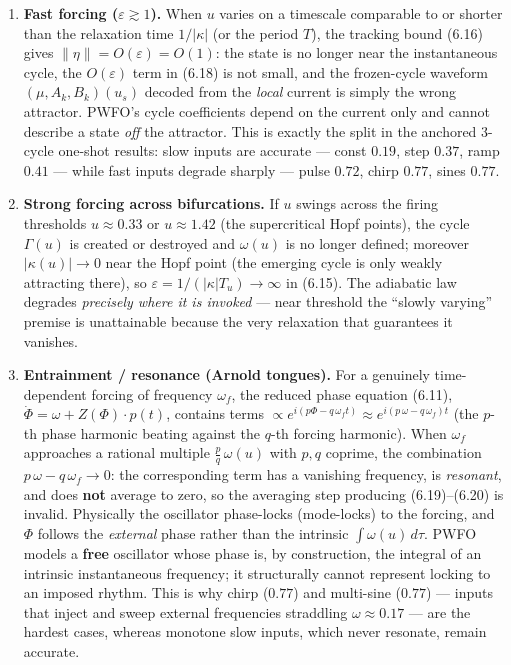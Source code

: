 \documentclass[
  11pt,
]{article}
\begin{document}
\begin{enumerate}
\def\labelenumi{\arabic{enumi}.}
\item
  \textbf{Fast forcing (\(\varepsilon\gtrsim1\)).} When \(u\) varies on
  a timescale comparable to or shorter than the relaxation time
  \(1/|\kappa|\) (or the period \(T\)), the tracking bound (6.16) gives
  \(\|\eta\|=O(\varepsilon)=O(1)\): the state is no longer near the
  instantaneous cycle, the \(O(\varepsilon)\) term in (6.18) is not
  small, and the frozen-cycle waveform \((\mu,A_k,B_k)(u_s)\) decoded
  from the \emph{local} current is simply the wrong attractor. PWFO's
  cycle coefficients depend on the current only and cannot describe a
  state \emph{off} the attractor. This is exactly the split in the
  anchored 3-cycle one-shot results: slow inputs are accurate --- const
  \(0.19\), step \(0.37\), ramp \(0.41\) --- while fast inputs degrade
  sharply --- pulse \(0.72\), chirp \(0.77\), sines \(0.77\).
\item
  \textbf{Strong forcing across bifurcations.} If \(u\) swings across
  the firing thresholds \(u\approx0.33\) or \(u\approx1.42\) (the
  supercritical Hopf points), the cycle \(\Gamma(u)\) is created or
  destroyed and \(\omega(u)\) is no longer defined; moreover
  \(|\kappa(u)|\to0\) near the Hopf point (the emerging cycle is only
  weakly attracting there), so \(\varepsilon=1/(|\kappa|T_u)\to\infty\)
  in (6.15). The adiabatic law degrades \emph{precisely where it is
  invoked} --- near threshold the ``slowly varying'' premise is
  unattainable because the very relaxation that guarantees it vanishes.
\item
  \textbf{Entrainment / resonance (Arnold tongues).} For a genuinely
  time-dependent forcing of frequency \(\omega_f\), the reduced phase
  equation (6.11), \(\dot\Phi=\omega+Z(\Phi)\cdot p(t)\), contains terms
  \(\propto e^{i(p\Phi-q\,\omega_f t)}\approx e^{i(p\,\omega-q\,\omega_f)t}\)
  (the \(p\)-th phase harmonic beating against the \(q\)-th forcing
  harmonic). When \(\omega_f\) approaches a rational multiple
  \(\tfrac{p}{q}\,\omega(u)\) with \(p,q\) coprime, the combination
  \(p\,\omega-q\,\omega_f\to0\): the corresponding term has a vanishing
  frequency, is \emph{resonant}, and does \textbf{not} average to zero,
  so the averaging step producing (6.19)--(6.20) is invalid. Physically
  the oscillator phase-locks (mode-locks) to the forcing, and \(\Phi\)
  follows the \emph{external} phase rather than the intrinsic
  \(\int\omega(u)\,d\tau\). PWFO models a \textbf{free} oscillator whose
  phase is, by construction, the integral of an intrinsic instantaneous
  frequency; it structurally cannot represent locking to an imposed
  rhythm. This is why chirp (\(0.77\)) and multi-sine (\(0.77\)) ---
  inputs that inject and sweep external frequencies straddling
  \(\omega\approx0.17\) --- are the hardest cases, whereas monotone slow
  inputs, which never resonate, remain accurate.
\end{enumerate}
\end{document}
